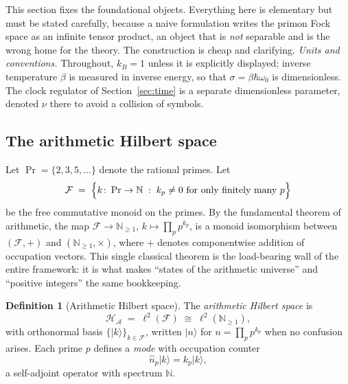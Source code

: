 \documentclass[11pt,a4paper]{article}
\theoremstyle{plain}
\theoremstyle{definition}
\newtheorem{definition}[theorem]{Definition}
\theoremstyle{remark}
\newcommand{\ket}[1]{\lvert #1\rangle}
\newcommand{\Nn}{\mathbb{N}}
\newcommand{\Hil}{\mathcal{H}}
\begin{document}
This section fixes the foundational objects. Everything here is elementary but must be stated
carefully, because a naive formulation writes the primon Fock space as an infinite tensor
product, an object that is \emph{not} separable and is the wrong home for the theory. The
construction is cheap and clarifying. \emph{Units and conventions.} Throughout,
$k_{B}=1$ unless it is explicitly displayed; inverse temperature $\beta$ is measured in
inverse energy, so that $\sigma=\beta\hbar\omega_{0}$ is dimensionless. The clock regulator
of Section~\ref{sec:time} is a separate dimensionless parameter, denoted $\nu$ there to avoid
a collision of symbols.

\subsection{The arithmetic Hilbert space}

Let $\Pr=\{2,3,5,\dots\}$ denote the rational primes. Let
\begin{equation}\label{eq:monoid}
\mathcal{F}\;=\;\Bigl\{k\colon \Pr\to\Nn \;:\; k_{p}\neq 0 \text{ for only finitely many } p\Bigr\}
\end{equation}
be the free commutative monoid on the primes. By the fundamental theorem of arithmetic, the
map $\mathcal{F}\to\Nn_{\geq 1}$, $k\mapsto \prod_{p}p^{k_{p}}$, is a monoid isomorphism
between $(\mathcal{F},+)$ and $(\Nn_{\geq 1},\times)$, where $+$ denotes componentwise addition
of occupation vectors. This single classical theorem is the load-bearing wall of the entire
framework: it is what makes ``states of the arithmetic universe'' and ``positive integers''
the same bookkeeping.

\begin{definition}[Arithmetic Hilbert space]\label{def:hilbert}
The \emph{arithmetic Hilbert space} is
\begin{equation}
\Hil_{\mathcal{A}}\;=\;\ell^{2}(\mathcal{F})\;\cong\;\ell^{2}(\Nn_{\geq 1}),
\end{equation}
with orthonormal basis $\{\ket{k}\}_{k\in\mathcal{F}}$, written $\ket{n}$ for
$n=\prod_{p}p^{k_{p}}$ when no confusion arises. Each prime $p$ defines a \emph{mode} with
occupation counter
\begin{equation}
\hat n_{p}\ket{k}=k_{p}\ket{k},
\end{equation}
a self-adjoint operator with spectrum $\Nn$.
\end{definition}
\end{document}
